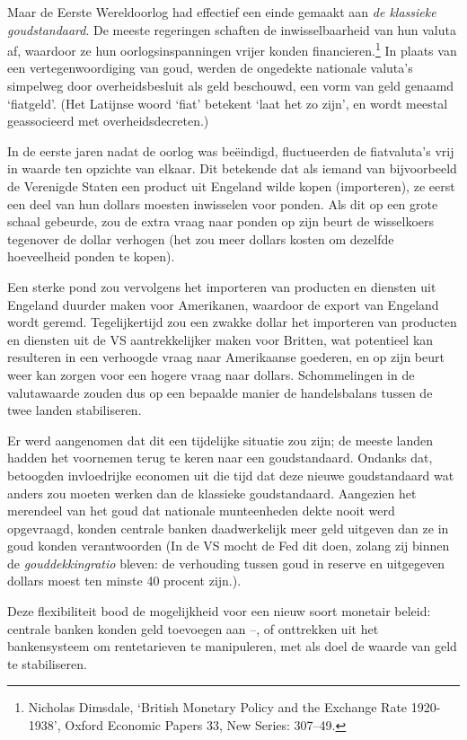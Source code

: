 \documentclass[smalldemyvopaper,11pt,twoside,onecolumn,openright,extrafontsizes,hidelinks]{memoir}
\begin{document}
Maar de Eerste Wereldoorlog had effectief een einde gemaakt aan \emph{de
klassieke goudstandaard}. De meeste regeringen schaften de
inwisselbaarheid van hun valuta af, waardoor ze hun oorlogsinspanningen
vrijer konden financieren.\footnote{\hspace{0pt}Nicholas Dimsdale,
  `British Monetary Policy and the Exchange Rate 1920-1938', Oxford
  Economic Papers 33, New Series: 307--49.} In plaats van een
vertegenwoordiging van goud, werden de ongedekte nationale valuta's
simpelweg door overheidsbesluit als geld beschouwd, een vorm van geld
genaamd `fiatgeld'. (Het Latijnse woord `fiat' betekent `laat het zo
zijn', en wordt meestal geassocieerd met overheidsdecreten.)

In de eerste jaren nadat de oorlog was beëindigd, fluctueerden de
fiatvaluta's vrij in waarde ten opzichte van elkaar. Dit betekende dat
als iemand van bijvoorbeeld de Verenigde Staten een product uit Engeland
wilde kopen (importeren), ze eerst een deel van hun dollars moesten
inwisselen voor ponden. Als dit op een grote schaal gebeurde, zou de
extra vraag naar ponden op zijn beurt de wisselkoers tegenover de dollar
verhogen (het zou meer dollars kosten om dezelfde hoeveelheid ponden te
kopen).

Een sterke pond zou vervolgens het importeren van producten en diensten
uit Engeland duurder maken voor Amerikanen, waardoor de export van
Engeland wordt geremd. Tegelijkertijd zou een zwakke dollar het
importeren van producten en diensten uit de VS aantrekkelijker maken
voor Britten, wat potentieel kan resulteren in een verhoogde vraag naar
Amerikaanse goederen, en op zijn beurt weer kan zorgen voor een hogere
vraag naar dollars. Schommelingen in de valutawaarde zouden dus op een
bepaalde manier de handelsbalans tussen de twee landen stabiliseren.

Er werd aangenomen dat dit een tijdelijke situatie zou zijn; de meeste
landen hadden het voornemen terug te keren naar een goudstandaard.
Ondanks dat, betoogden invloedrijke economen uit die tijd dat deze
nieuwe goudstandaard wat anders zou moeten werken dan de klassieke
goudstandaard. Aangezien het merendeel van het goud dat nationale
munteenheden dekte nooit werd opgevraagd, konden centrale banken
daadwerkelijk meer geld uitgeven dan ze in goud konden verantwoorden (In
de VS mocht de Fed dit doen, zolang zij binnen de
\emph{gouddekkingratio} bleven: de verhouding tussen goud in reserve en
uitgegeven dollars moest ten minste 40 procent zijn.).

Deze flexibiliteit bood de mogelijkheid voor een nieuw soort monetair
beleid: centrale banken konden geld toevoegen aan --, of onttrekken uit
het bankensysteem om rentetarieven te manipuleren, met als doel de
waarde van geld te stabiliseren.
\end{document}
